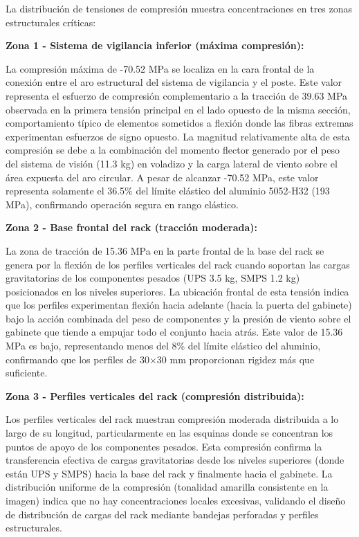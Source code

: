 \documentclass[12pt,a4paper,oneside]{report}
\begin{document}
La distribución de tensiones de compresión muestra concentraciones en tres zonas estructurales críticas:

\textbf{Zona 1 - Sistema de vigilancia inferior (máxima compresión):}

La compresión máxima de -70.52 MPa se localiza en la cara frontal de la conexión entre el aro estructural del sistema de vigilancia y el poste. Este valor representa el esfuerzo de compresión complementario a la tracción de 39.63 MPa observada en la primera tensión principal en el lado opuesto de la misma sección, comportamiento típico de elementos sometidos a flexión donde las fibras extremas experimentan esfuerzos de signo opuesto. La magnitud relativamente alta de esta compresión se debe a la combinación del momento flector generado por el peso del sistema de visión (11.3 kg) en voladizo y la carga lateral de viento sobre el área expuesta del aro circular. A pesar de alcanzar -70.52 MPa, este valor representa solamente el 36.5\% del límite elástico del aluminio 5052-H32 (193 MPa), confirmando operación segura en rango elástico.

\textbf{Zona 2 - Base frontal del rack (tracción moderada):}

La zona de tracción de 15.36 MPa en la parte frontal de la base del rack se genera por la flexión de los perfiles verticales del rack cuando soportan las cargas gravitatorias de los componentes pesados (UPS 3.5 kg, SMPS 1.2 kg) posicionados en los niveles superiores. La ubicación frontal de esta tensión indica que los perfiles experimentan flexión hacia adelante (hacia la puerta del gabinete) bajo la acción combinada del peso de componentes y la presión de viento sobre el gabinete que tiende a empujar todo el conjunto hacia atrás. Este valor de 15.36 MPa es bajo, representando menos del 8\% del límite elástico del aluminio, confirmando que los perfiles de 30\ensuremath{\times}30 mm proporcionan rigidez más que suficiente.

\textbf{Zona 3 - Perfiles verticales del rack (compresión distribuida):}

Los perfiles verticales del rack muestran compresión moderada distribuida a lo largo de su longitud, particularmente en las esquinas donde se concentran los puntos de apoyo de los componentes pesados. Esta compresión confirma la transferencia efectiva de cargas gravitatorias desde los niveles superiores (donde están UPS y SMPS) hacia la base del rack y finalmente hacia el gabinete. La distribución uniforme de la compresión (tonalidad amarilla consistente en la imagen) indica que no hay concentraciones locales excesivas, validando el diseño de distribución de cargas del rack mediante bandejas perforadas y perfiles estructurales.
\end{document}
